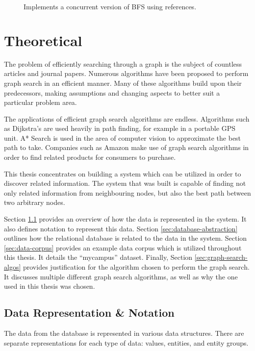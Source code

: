 \documentclass[12pt,letterpaper,oneside,notitlepage]{report}
\theoremstyle{definition}
\begin{document}
    \begin{figure}[ht!]
      
      \caption{Implements a concurrent version of BFS using references.}
      \label{src:molly-algo-bfs-ref-bfs-atom}
    \end{figure}
  
  \chapter{Theoretical}
    The problem of efficiently searching through a graph is the subject of countless articles and journal papers.  Numerous algorithms have been proposed to perform graph search in an efficient manner.  Many of these algorithms build upon their predecessors, making assumptions and changing aspects to better suit a particular problem area.
    
    The applications of efficient graph search algorithms are endless.  Algorithms such as Dijkstra's are used heavily in path finding, for example in a portable GPS unit.  A* Search is used in the area of computer vision to approximate the best path to take.  Companies such as Amazon make use of graph search algorithms in order to find related products for consumers to purchase.
    
    This thesis concentrates on building a system which can be utilized in order to discover related information.  The system that was built is capable of finding not only related information from neighbouring nodes, but also the best path between two arbitrary nodes.
    
    Section \ref{sec:data-rep-and-notation} provides an overview of how the data is represented in the system.  It also defines notation to represent this data.  Section \ref{sec:database-abstraction} outlines how the relational database is related to the data in the system.  Section \ref{sec:data-corpus} provides an example data corpus which is utilized throughout this thesis.  It details the ``mycampus'' dataset.  Finally, Section \ref{sec:graph-search-algos} provides justification for the algorithm chosen to perform the graph search.  It discusses multiple different graph search algorithms, as well as why the one used in this thesis was chosen.
    
    \section{Data Representation \& Notation}
    \label{sec:data-rep-and-notation}
      The data from the database is represented in various data structures.  There are separate representations for each type of data:  values, entities, and entity groups.
\end{document}

